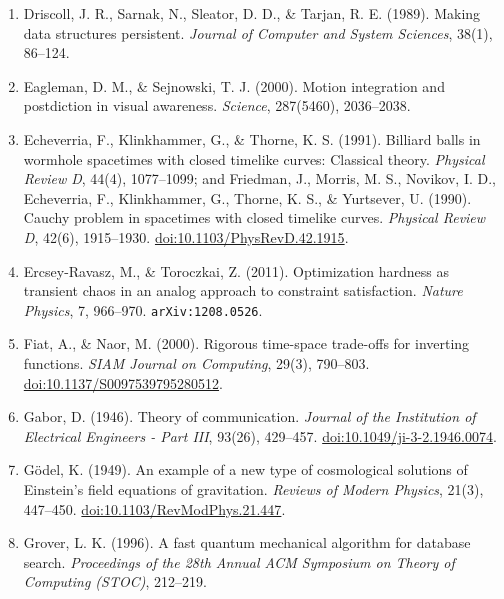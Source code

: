 \documentclass[10pt,letterpaper]{article}
\begin{document}
\begin{enumerate}
  Dragoi, G., \& Tonegawa, S. (2011). Preplay of future place cell
  sequences by hippocampal cellular assemblies. \emph{Nature}, 469,
  397--401; and Foster, D. J., \& Wilson, M. A. (2006). Reverse replay
  of behavioural sequences in hippocampal place cells during the awake
  state. \emph{Nature}, 440, 680--683.
\item
  Driscoll, J. R., Sarnak, N., Sleator, D. D., \& Tarjan, R. E. (1989).
  Making data structures persistent. \emph{Journal of Computer and
  System Sciences}, 38(1), 86--124.
\item
  Eagleman, D. M., \& Sejnowski, T. J. (2000). Motion integration and
  postdiction in visual awareness. \emph{Science}, 287(5460),
  2036--2038.
\item
  Echeverria, F., Klinkhammer, G., \& Thorne, K. S. (1991). Billiard
  balls in wormhole spacetimes with closed timelike curves: Classical
  theory. \emph{Physical Review D}, 44(4), 1077--1099; and Friedman, J.,
  Morris, M. S., Novikov, I. D., Echeverria, F., Klinkhammer, G.,
  Thorne, K. S., \& Yurtsever, U. (1990). Cauchy problem in spacetimes
  with closed timelike curves. \emph{Physical Review D}, 42(6),
  1915--1930.
  \href{https://doi.org/10.1103/PhysRevD.42.1915}{doi:10.1103/PhysRevD.42.1915}.
\item
  Ercsey-Ravasz, M., \& Toroczkai, Z. (2011). Optimization hardness as
  transient chaos in an analog approach to constraint satisfaction.
  \emph{Nature Physics}, 7, 966--970. \texttt{arXiv:1208.\allowbreak{}0526}.
\item
  Fiat, A., \& Naor, M. (2000). Rigorous time-space trade-offs for
  inverting functions. \emph{SIAM Journal on Computing}, 29(3),
  790--803.
  \href{https://doi.org/10.1137/S0097539795280512}{doi:10.1137/S0097539795280512}.
\item
  Gabor, D. (1946). Theory of communication. \emph{Journal of the
  Institution of Electrical Engineers - Part III}, 93(26), 429--457.
  \href{https://doi.org/10.1049/ji-3-2.1946.0074}{doi:10.1049/ji-3-2.1946.0074}.
\item
  Gödel, K. (1949). An example of a new type of cosmological solutions
  of Einstein's field equations of gravitation. \emph{Reviews of Modern
  Physics}, 21(3), 447--450.
  \href{https://doi.org/10.1103/RevModPhys.21.447}{doi:10.1103/RevModPhys.21.447}.
\item
  Grover, L. K. (1996). A fast quantum mechanical algorithm for database
  search. \emph{Proceedings of the 28th Annual ACM Symposium on Theory
  of Computing (STOC)}, 212--219.

\end{enumerate}
\end{document}

